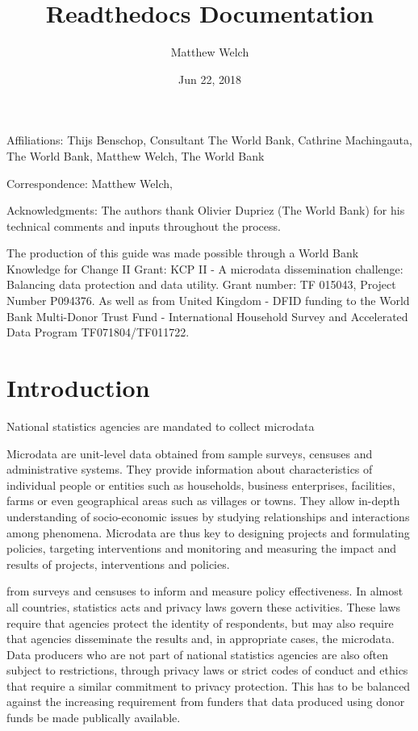 \documentclass[letterpaper,10pt,english]{sphinxmanual}
\title{Readthedocs Documentation}
\date{Jun 22, 2018}
\author{Matthew Welch}
\begin{document}
\maketitle
\sphinxtableofcontents
{}\label{\detokenize{index::doc}}





Affiliations: Thijs Benschop, Consultant The World Bank, Cathrine
Machingauta, The World Bank, Matthew Welch, The World Bank

Correspondence: Matthew Welch, 

Acknowledgments: The authors thank Olivier Dupriez (The World Bank) for
his technical comments and inputs throughout the process.

The production of this guide was made possible through a World Bank
Knowledge for Change II Grant: KCP II - A microdata dissemination
challenge: Balancing data protection and data utility. Grant number: TF
015043, Project Number P094376. As well as from United Kingdom - DFID
funding to the World Bank Multi-Donor Trust Fund - International
Household Survey and Accelerated Data Program \textendash{} TF071804/TF011722.


\chapter{Introduction}
\label{\detokenize{intro::doc}}\label{\detokenize{intro:introduction}}\label{\detokenize{intro:statistical-disclosure-control-for-microdata-a-practice-guide}}
National statistics agencies are mandated to collect
microdata %
\begin{footnote}[1]\sphinxAtStartFootnote
Microdata are unit-level data obtained from sample surveys, censuses
and administrative systems. They provide information about
characteristics of individual people or entities such as households,
business enterprises, facilities, farms or even geographical areas
such as villages or towns. They allow in-depth understanding of
socio-economic issues by studying relationships and interactions
among phenomena. Microdata are thus key to designing projects and
formulating policies, targeting interventions and monitoring and
measuring the impact and results of projects, interventions and
policies.
%
\end{footnote} from surveys and censuses to inform and
measure policy effectiveness. In almost all countries, statistics acts
and privacy laws govern these activities. These laws require that
agencies protect the identity of respondents, but may also require that
agencies disseminate the results and, in appropriate cases, the
microdata. Data producers who are not part of national statistics
agencies are also often subject to restrictions, through privacy laws or
strict codes of conduct and ethics that require a similar commitment to
privacy protection. This has to be balanced against the increasing
requirement from funders that data produced using donor funds be made
publically available.
\end{document}
